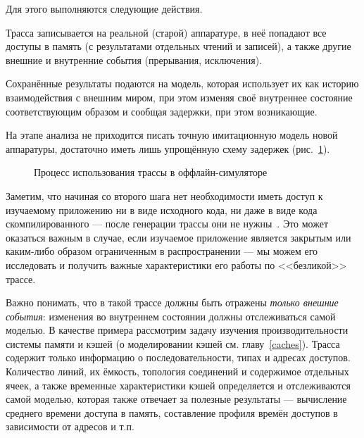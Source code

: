 Для этого выполняются следующие действия.

\begin{enumerate*}
    \item Трасса записывается на реальной (старой) аппаратуре, в неё попадают все доступы в память (с результатами отдельных чтений и записей), а также другие внешние и внутренние события (прерывания, исключения). 
    \item Сохранённые результаты подаются на модель, которая использует их как историю взаимодействия с внешним миром, при этом изменяя своё внутреннее состояние соответствующим образом и сообщая задержки, при этом возникающие. 
    \item На этапе анализа не приходится писать точную имитационную модель новой аппаратуры, достаточно иметь лишь упрощённую схему задержек (рис.~\ref{fig:offline-sim-trace}).
\end{enumerate*}

\begin{figure}[htb]
    \centering
    \caption{Процесс использования трассы в оффлайн-симуляторе}
    \label{fig:offline-sim-trace}
\end{figure}

Заметим, что начиная со второго шага нет необходимости иметь доступ к изучаемому приложению ни в виде исходного кода, ни даже в виде кода скомпилированного --- после генерации трассы они не нужны~\cite{Cain02preciseand}. Это может оказаться важным в случае, если изучаемое приложение является закрытым или каким-либо образом ограниченным в распространении ---  мы можем его исследовать и получить важные характеристики его работы по <<безликой>> трассе.

Важно понимать, что в такой трассе должны быть отражены \textit{только внешние события}: изменения во внутреннем состоянии должны отслеживаться самой моделью. В качестве примера рассмотрим задачу изучения производительности системы памяти и кэшей (о моделировании кэшей см. главу~\ref{caches}). Трасса содержит только информацию о последовательности, типах и адресах доступов. Количество линий, их ёмкость, топология соединений и содержимое отдельных ячеек, а также временные характеристики кэшей определяется и отслеживаются самой моделью, которая также отвечает за полезные результаты --- вычисление среднего времени доступа в память, составление профиля времён доступов в зависимости от адресов и т.п.


